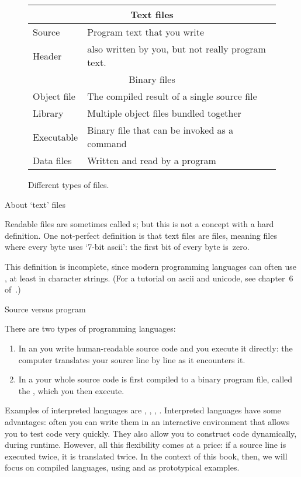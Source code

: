 \begin{figure}[ht]
  \begin{tabular}{ll}
    \toprule
    \multicolumn{2}{c}{Text files}\\
    \midrule
    Source&Program text that you write\\
    Header&also written by you, but not really program text.\\
    \midrule
    \multicolumn{2}{c}{Binary files}\\
    \midrule
    Object file&The compiled result of a single source file\\
    Library&Multiple object files bundled together\\
    Executable&Binary file that can be invoked as a command\\
    Data files&Written and read by a program\\
    \midrule
  \end{tabular}
  \caption{Different types of files.}
  \label{fig:file-types}
\end{figure}

 {About `text' files}

Readable files are sometimes called s;
but this is not a concept with a hard definition.
One not-perfect definition is that text files are  files,
meaning files where every byte uses `7-bit ascii': the first bit of every
byte is~zero.

This definition is incomplete, since modern programming languages
can often use , at least in character strings.
(For a tutorial on ascii and unicode, see chapter~6
of~\cite{Eijkhout:TeXscience}.)

 {Source versus program}

There are two types of programming languages:
\begin{enumerate}
\item In an  you write
  human-readable source code and you execute it directly: the computer
  translates your source line by line as it encounters it. 
\item In a  your whole source code
  is first compiled to a binary program file,
  called the ,
  which you then execute.
\end{enumerate}
Examples of interpreted languages are ,
, , .
Interpreted languages have some advantages: often you can write them
in an interactive environment that allows you to test code very
quickly. They also allow you to construct code dynamically, during
runtime. However, all this flexibility comes at a price: if a source
line is executed twice, it is translated twice. In the context of this
book, then, we will focus on compiled languages, using 
and  as prototypical examples.

